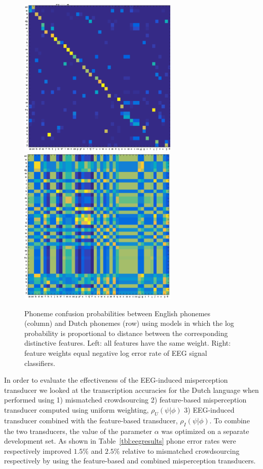 \begin{figure}
  \centerline{
    \includegraphics[width=3in]{../figs/mirbagheri_dist_features.png}
    \includegraphics[width=3in]{../figs/mirbagheri_dist_eeg.png}
  }
  \caption{Phoneme confusion probabilities between English phonemes
    (column) and Dutch phonemes (row) using models in which the log
    probability is proportional to distance between the corresponding
    distinctive features.  Left: all features have the same
    weight.  Right: feature weights equal negative log error rate of
    EEG signal classifiers.}
  \label{fig:eeg_confusions}
\end{figure}

In order to evaluate the effectiveness of the EEG-induced misperception transducer we looked at the transcription accuracies for the Dutch language when performed using 1) mismatched crowdsourcing 2) feature-based misperception transducer computed using uniform weighting, $\rho_U(\psi|\phi)$ 3) EEG-induced transducer combined with the feature-based transducer, $\rho_I(\psi|\phi)$. To combine the two transducers, the value of the parameter $\alpha$ was optimized on a separate development set. As shown in Table~\ref{tbl:eegresults} phone error rates were respectively improved $1.5\%$ and $2.5\%$ relative to mismatched crowdsourcing respectively by using the feature-based and combined misperception transducers. 

